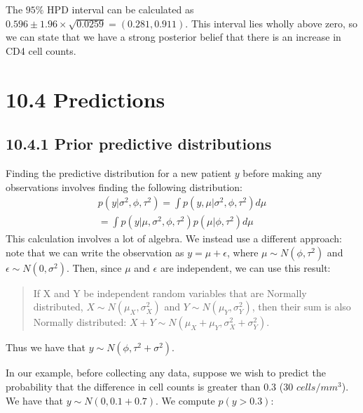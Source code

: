 \documentclass[letterpaper,10pt,english]{jupyterBook}
\begin{document}
\noindent{}

\sphinxAtStartPar
The  \(95\%\) HPD interval can be calculated as \(0.596 \pm 1.96 \times \sqrt{0.0259} = (0.281, 0.911)\). This interval lies wholly above zero, so we can state that we have a strong posterior belief that there is an increase in CD4 cell counts.


\section{10.4 Predictions}
\label{\detokenize{10.e. Bayesian Statistics II:predictions}}\label{\detokenize{10.e. Bayesian Statistics II::doc}}

\subsection{10.4.1 Prior predictive distributions}
\label{\detokenize{10.e. Bayesian Statistics II:prior-predictive-distributions}}
\sphinxAtStartPar
Finding the predictive distribution for a new patient \(y\) before making any observations involves finding the following distribution:
\begin{equation*}
\begin{split}
p(y | \sigma^2, \phi, \tau^2) = \int p(y, \mu | \sigma^2, \phi, \tau^2) d \mu\\
= \int p(y | \mu, \sigma^2, \phi, \tau^2) p(\mu |  \phi, \tau^2) d \mu
\end{split}
\end{equation*}
\sphinxAtStartPar
This calculation involves a lot of algebra. We instead use a different approach: note that we can write the observation as \(y = \mu + \epsilon\), where \(\mu \sim N(\phi, \tau^2)\) and \(\epsilon \sim N(0, \sigma^2)\). Then, since \(\mu\) and \(\epsilon\) are independent, we can use this result:
\begin{quote}

\sphinxAtStartPar
If X and Y be independent random variables that are Normally distributed, \(X\sim N(\mu _{X},\sigma _{X}^{2})\) and \(Y\sim N(\mu _{Y},\sigma _{Y}^{2})\), then their sum is also Normally distributed: \(X + Y \sim N(\mu _{X}+\mu _{Y},\sigma _{X}^{2}+\sigma _{Y}^{2})\).
\end{quote}

\sphinxAtStartPar
Thus we have that \(y \sim N(\phi, \tau^2 + \sigma^2)\).

\sphinxAtStartPar
In our example, before collecting any data, suppose we wish to predict the probability that the difference in cell counts is greater than 0.3 (30 \(cells/mm^3\)). We have that \(y \sim N(0, 0.1 + 0.7)\). We compute \(p(y > 0.3)\):
\end{document}

